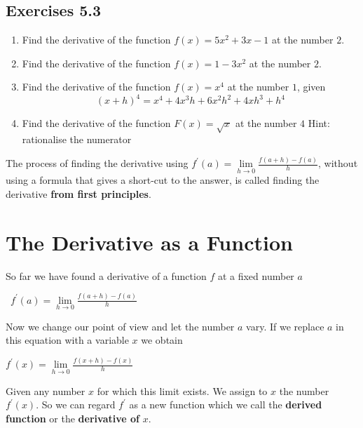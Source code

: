 \subsection{Exercises 5.3}
\begin{enumerate}
\item Find the derivative of the function $f (x) =5 x^{2} +3 x -1$ at the number $2$. 

\item Find the derivative of the function $f (x) =1 -3 x^{2}$ at the number $2$. 

\item Find the derivative of the function $f (x) =x^{4}$ at the number $1$, given
\begin{equation*}(x +h)^{4} =x^{4} +4 x^{3} h +6 x^{2} h^{2} +4 x h^{3} +h^{4}
\end{equation*}

\item Find the derivative of the function $F (x) =\sqrt{x}$ at the number $4$ Hint: rationalise the numerator \end{enumerate}

The process of finding the derivative using $f^{ \prime } (a) =\underset{h \rightarrow 0}{\lim }\frac{f (a +h) -f (a)}{h}\text{,}$ without using a formula that gives a short-cut to the answer, is called finding the derivative \textbf{from first principles}.

\section{The Derivative as a Function}
So far we have found a derivative of a function $f$ at a fixed number $a$ 

\begin{center}
\ $f^{ \prime } (a) =\underset{h \rightarrow 0}{\lim }\frac{f (a +h) -f (a)}{h}$
\end{center}\par
Now we change our point of view and let the number $a$ vary. If we replace $a$ in this equation with a variable $x$ we obtain 

\begin{center}
$f^{ \prime } (x) =\underset{h \rightarrow 0}{\lim }\frac{f (x +h) -f (x)}{h}$
\end{center}\par
Given any number $x$ for which this limit exists. We assign to $x$ the number $f^{ \prime } \left (x\right )$. So we can regard $f^{ \prime }$ as a new function which we call the \textbf{derived function} or the \textbf{derivative
of }$x$. 


